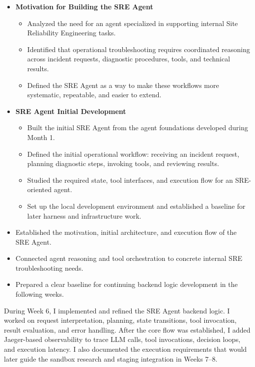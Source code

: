 \begin{itemize}
    \item \textbf{Motivation for Building the SRE Agent}
    \begin{itemize}
        \item Analyzed the need for an agent specialized in supporting internal Site Reliability Engineering tasks.
        \item Identified that operational troubleshooting requires coordinated reasoning across incident requests, diagnostic procedures, tools, and technical results.
        \item Defined the SRE Agent as a way to make these workflows more systematic, repeatable, and easier to extend.
    \end{itemize}

    \item \textbf{SRE Agent Initial Development}
    \begin{itemize}
        \item Built the initial SRE Agent from the agent foundations developed during Month 1.
        \item Defined the initial operational workflow: receiving an incident request, planning diagnostic steps, invoking tools, and reviewing results.
        \item Studied the required state, tool interfaces, and execution flow for an SRE-oriented agent.
        \item Set up the local development environment and established a baseline for later harness and infrastructure work.
    \end{itemize}
\end{itemize}


\begin{itemize}
    \item Established the motivation, initial architecture, and execution flow of the SRE Agent.
    \item Connected agent reasoning and tool orchestration to concrete internal SRE troubleshooting needs.
    \item Prepared a clear baseline for continuing backend logic development in the following weeks.
\end{itemize}


During Week 6, I implemented and refined the SRE Agent backend logic. I worked on request interpretation, planning, state transitions, tool invocation, result evaluation, and error handling. After the core flow was established, I added Jaeger-based observability to trace LLM calls, tool invocations, decision loops, and execution latency. I also documented the execution requirements that would later guide the sandbox research and staging integration in Weeks 7--8.

